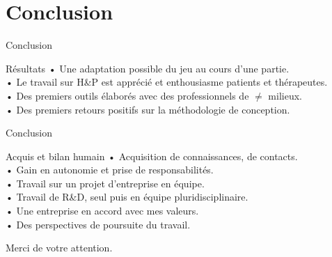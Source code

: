 \documentclass{beamer}
\begin{document}
	\section{Conclusion}
		\begin{frame}{Conclusion}
			\begin{block}{Résultats}
				• Une adaptation possible du jeu au cours d'une partie.\\
				• Le travail sur H\&P est apprécié et enthousiasme patients et thérapeutes.\\
				• Des premiers outils élaborés avec des professionnels de $\ne$ milieux.\\
				• Des premiers retours positifs sur la méthodologie de conception.
			\end{block}
		\end{frame}
			
		\begin{frame}{Conclusion}
			\begin{block}{Acquis et bilan humain}
				• Acquisition de connaissances, de contacts.\\
				• Gain en autonomie et prise de responsabilités.\\
				• Travail sur un projet d'entreprise en équipe.\\
				• Travail de  R\&D, seul puis en équipe pluridisciplinaire.\\
				• Une entreprise en accord avec mes valeurs.\\
				• Des perspectives de poursuite du travail.
			\end{block}
		\end{frame}
		
		\begin{frame}
			\begin{center}
				\huge{Merci de votre attention.}			
			\end{center}
		\end{frame}
\end{document}
